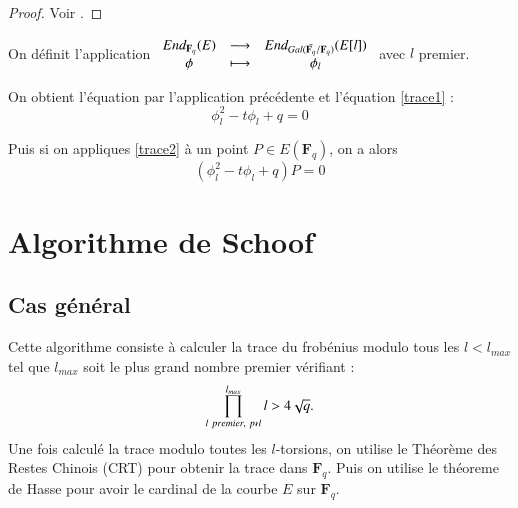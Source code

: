 \documentclass{article}%
\theoremstyle{plain}
\theoremstyle{definition}
\theoremstyle{plain}
\theoremstyle{plain}
\theoremstyle{remark}
\newcommand\fq{\mathbf{F}_{q}}
\begin{document}
\begin{proof}
Voir \cite{ref6}.
\end{proof}
  
On définit l'application $
\begin{array}{cl cl}
End_{\fq}(E)&\longrightarrow&End_{Gal(\bar{\fq}/\fq)}(E[l])\\
\phi&\longmapsto&\phi_{l}
\end{array}
$ avec $l$ premier.

On obtient l'équation par l'application précédente et l'équation \eqref{trace1} :
\begin{equation}
\phi_{l}^{2} - t\phi_{l} + q = 0
\label{trace2}
\end{equation}

Puis si on appliques \eqref{trace2} à un point $P\in E(\fq)$, on a alors 
\begin{equation}
(\phi_{l}^{2} - t\phi_{l} + q)P = 0
\label{trace2}
\end{equation}


\section{Algorithme de Schoof}
\subsection{Cas général}

Cette algorithme consiste à calculer la trace du frobénius modulo tous les $l<l_{max}$ tel que $l_{max}$ soit le plus grand nombre premier vérifiant :\begin{equation} 
\prod_{l\ premier,\ p\nshortmid l}^{l_{max}}l > 4\sqrt{q}.
\label{primorielle}
\end{equation}
Une fois calculé la trace modulo toutes les $l$-torsions, on utilise le Théorème des Restes Chinois (CRT) pour obtenir la trace dans $\fq$. Puis on utilise le théoreme de Hasse pour avoir le cardinal de la courbe $E$ sur $\fq$.
\end{document}
